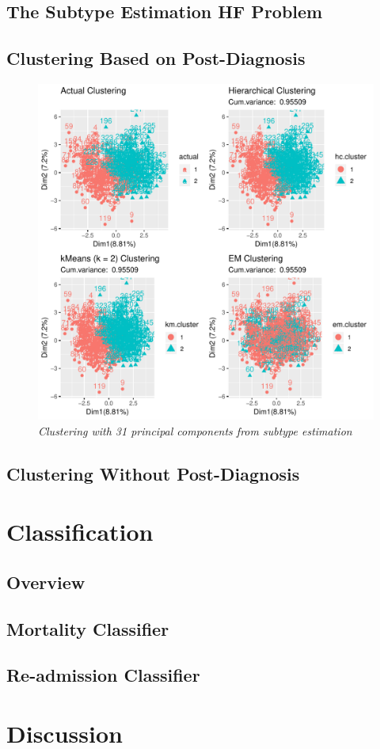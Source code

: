 \documentclass[../thesis.tex]{subfiles}
\begin{document}
\subsection{The Subtype Estimation HF Problem}

\subsection{Clustering Based on Post-Diagnosis}

\begin{figure}
    \centering
    \includegraphics[width=1.15\textwidth]{doc/thesis/images/clustFull.pdf}
    \caption{\textit{Clustering with 31 principal components from subtype estimation}}
    \label{fig:clust_fulle}
\end{figure}

\subsection{Clustering Without Post-Diagnosis}

\section{Classification}

\subsection{Overview}

\subsection{Mortality Classifier}

\subsection{Re-admission Classifier}

\section{Discussion}
\end{document}
